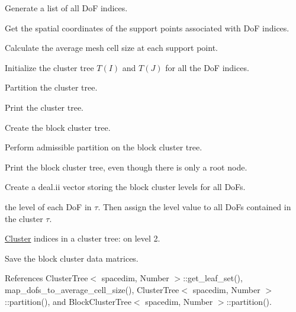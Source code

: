 Generate a list of all DoF indices.

Get the spatial coordinates of the support points associated with DoF indices.

Calculate the average mesh cell size at each support point.

Initialize the cluster tree $T(I)$ and $T(J)$ for all the DoF indices.

Partition the cluster tree.

Print the cluster tree.

Create the block cluster tree.

Perform admissible partition on the block cluster tree.

Print the block cluster tree, even though there is only a root node.

Create a deal.\+ii vector storing the block cluster levels for all Do\+Fs.

 the level of each DoF in $\tau$. Then assign the level value to all Do\+Fs contained in the cluster $\tau$.

\hyperlink{classCluster}{Cluster} indices in a cluster tree\+: on level 2.

Save the block cluster data matrices.

References Cluster\+Tree$<$ spacedim, Number $>$\+::get\+\_\+leaf\+\_\+set(), map\+\_\+dofs\+\_\+to\+\_\+average\+\_\+cell\+\_\+size(), Cluster\+Tree$<$ spacedim, Number $>$\+::partition(), and Block\+Cluster\+Tree$<$ spacedim, Number $>$\+::partition().

